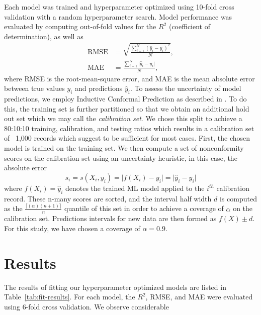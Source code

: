 \documentclass[journal,article,submit,pdftex,moreauthors]{Definitions/mdpi}
\begin{document}
Each model was trained and hyperparameter optimized using 10-fold cross validation with a random hyperparameter search.  Model performance was evaluated by computing out-of-fold values for the $R^2$ (coefficient of determination), as well as
\begin{align}
    \text{RMSE} &= \sqrt{\frac{\sum\limits_{i=1}^N (\hat{y}_i-y_i)^2}{N}}, \\
    \text{MAE} &= \frac{\sum\limits_{i=1}^N \lvert \hat{y}_i - y_i \vert}{N},
\end{align}
where RMSE is the root-mean-square error, and MAE is the mean absolute error between true values $y_i$ and predictions $\hat{y}_i$. To assess the uncertainty of model predictions, we employ Inductive Conformal Prediction as described in \cite{conformal-prediction-1, conformal-prediction-2, conformal-prediction-3, conformal-prediction-4}. To do this, the training set is further partitioned so that we obtain an additional hold out set which we may call the \textit{calibration set}. We chose this split to achieve a 80:10:10 training, calibration, and testing ratios which results in a calibration set of ~1,000 records which \cite{conformal-prediction-2} suggest to be sufficient for most cases. First, the chosen model is trained on the training set. We then compute a set of nonconformity scores on the calibration set using an uncertainty heuristic, in this case, the absolute error
\begin{equation}
    s_i = s(X_i, y_i) = \lvert f(X_i) - y_i \rvert = \lvert \hat{y}_i - y_i \rvert
\end{equation}
where $f(X_i)=\hat{y}_i$ denotes the trained ML model applied to the $i^{th}$ calibration record. These n-many scores are sorted, and the interval half width $d$ is computed as the $\frac{\lceil(\alpha)(n+1) \rceil}{n}$ quantile of this set in order to achieve a coverage of $\alpha$ on the calibration set. Predictions intervals for new data are then formed as $f(X)\pm d$. For this study, we have chosen a coverage of $\alpha=0.9$.

\section{Results}

The results of fitting our hyperparameter optimized models are listed in Table~\ref{tab:fit-results}. For each model, the $R^2$, RMSE, and MAE were evaluated using 6-fold cross validation. We observe considerable 
\end{document}
